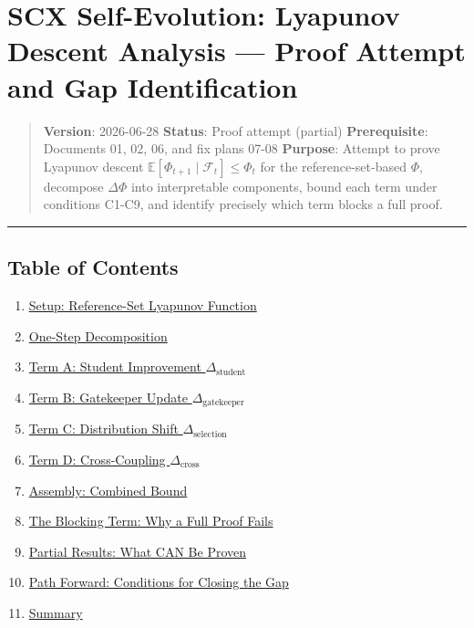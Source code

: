 \documentclass[
  12pt,
]{ctexart}
\author{SCX}
\date{2026}
\providecommand{\tightlist}{%
  \setlength{\itemsep}{0pt}\setlength{\parskip}{0pt}}
\begin{document}
\section{SCX Self-Evolution: Lyapunov Descent Analysis --- Proof Attempt
and Gap
Identification}\label{scx-self-evolution-lyapunov-descent-analysis-proof-attempt-and-gap-identification}

\begin{quote}
\textbf{Version}: 2026-06-28 \textbar{} \textbf{Status}: Proof attempt
(partial) \textbar{} \textbf{Prerequisite}: Documents 01, 02, 06, and
fix plans 07-08 \textbf{Purpose}: Attempt to prove Lyapunov descent
\(\mathbb{E}[\Phi_{t+1} \mid \mathcal{F}_t] \leq \Phi_t\) for the
reference-set-based \(\Phi\), decompose \(\Delta\Phi\) into
interpretable components, bound each term under conditions C1-C9, and
identify precisely which term blocks a full proof.
\end{quote}

\begin{center}\rule{0.5\linewidth}{0.5pt}\end{center}

\subsection{Table of Contents}\label{table-of-contents}

\begin{enumerate}
\def\labelenumi{\arabic{enumi}.}
\tightlist
\item
  \hyperref[1-setup-reference-set-lyapunov-function]{Setup:
  Reference-Set Lyapunov Function}
\item
  \hyperref[2-one-step-decomposition]{One-Step Decomposition}
\item
  \hyperref[3-term-a-student-improvement-deltatextstudent]{Term A:
  Student Improvement \(\Delta_{\text{student}}\)}
\item
  \hyperref[4-term-b-gatekeeper-update-deltatextgatekeeper]{Term B:
  Gatekeeper Update \(\Delta_{\text{gatekeeper}}\)}
\item
  \hyperref[5-term-c-distribution-shift-deltatextselection]{Term C:
  Distribution Shift \(\Delta_{\text{selection}}\)}
\item
  \hyperref[6-term-d-cross-coupling-deltatextcross]{Term D:
  Cross-Coupling \(\Delta_{\text{cross}}\)}
\item
  \hyperref[7-assembly-combined-bound]{Assembly: Combined Bound}
\item
  \hyperref[8-the-blocking-term-why-a-full-proof-fails]{The Blocking
  Term: Why a Full Proof Fails}
\item
  \hyperref[9-partial-results-what-can-be-proven]{Partial Results: What
  CAN Be Proven}
\item
  \hyperref[10-path-forward-conditions-for-closing-the-gap]{Path
  Forward: Conditions for Closing the Gap}
\item
  \hyperref[11-summary]{Summary}
\end{enumerate}
\end{document}
